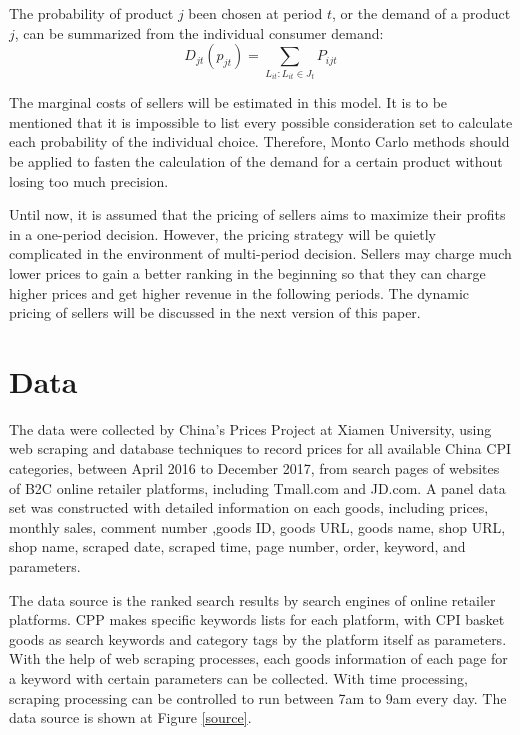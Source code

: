 \documentclass{article}
\begin{document}
The probability of product $j$ been chosen at period $t$, or the demand of a product $j$, can be summarized from the individual consumer demand:
$$
D_{jt}(p_{jt}) = \sum_{L_{it}: L_{it}\in J_t} P_{ijt}
$$ 

The marginal costs of sellers will be estimated in this model. It is to be mentioned that it is impossible to list every possible consideration set to calculate each probability of the individual choice. Therefore, Monto Carlo methods should be applied to fasten the calculation of the demand for a certain product without losing too much precision. 

Until now, it is assumed that the pricing of sellers aims to maximize their profits in a one-period decision. However, the pricing strategy will be quietly complicated in the environment of multi-period decision. Sellers may charge much lower prices to gain a better ranking in the beginning so that they can charge higher prices and get higher revenue in the following periods. The dynamic pricing of sellers will be discussed in the next version of this paper. 


\section{Data}
The data were collected by China's Prices Project at Xiamen University, using web scraping and database techniques to record prices for all available China CPI categories, between April 2016 to December 2017, from search pages of websites of B2C online retailer platforms, including Tmall.com and JD.com. A panel data set was constructed with detailed information on each goods, including prices, monthly sales, comment number ,goods ID, goods URL, goods name, shop URL, shop name, scraped date, scraped time, page number, order, keyword, and parameters. 

The data source is the ranked search results by search engines of online retailer platforms. CPP makes specific keywords lists for each platform, with CPI basket goods as search keywords and category tags by the platform itself as parameters. With the help of web scraping processes, each goods information of each page for a keyword with certain parameters can be collected. With time processing, scraping processing can be controlled to run between 7am to 9am every day. The data source is shown at Figure \ref{source}. 
\end{document}

